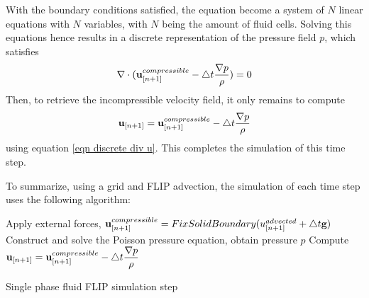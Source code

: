 With the boundary conditions satisfied, the equation become a system of $N$ linear equations with $N$ variables, with $N$ being the amount of fluid cells. Solving this equations hence results in a discrete representation of the pressure field $p$, which satisfies 
$$
\nabla \cdot
 ( \textbf{u}_{[n+1]}^{compressible} - \triangle t \frac{\nabla p}{\rho} ) = 0
$$
Then, to retrieve the incompressible velocity field, it only remains to compute
$$ \textbf{u}_{[n+1]} = \textbf{u}_{[n+1]}^{compressible} - \triangle t \frac{\nabla p}{\rho}$$
using equation \ref{eqn discrete div u}. This completes the simulation of this time step.

\gapM

To summarize, using a grid and FLIP advection, the simulation of each time step uses the following algorithm:

\begin{algorithm}[H]
    \label{algo singlephase flip}

    \SetAlgoLined
    Apply external forces, $\textbf{u}_{[n+1]}^{compressible} =  FixSolidBoundary(u_{[n+1]}^{advected} + \triangle t \textbf{g})$\;
    Construct and solve the Poisson pressure equation, obtain pressure $p$\;
    Compute $\textbf{u}_{[n+1]} = \textbf{u}_{[n+1]}^{compressible} - \triangle t \dfrac{\nabla p}{\rho}$

    \caption{Single phase fluid FLIP simulation step}
\end{algorithm}


